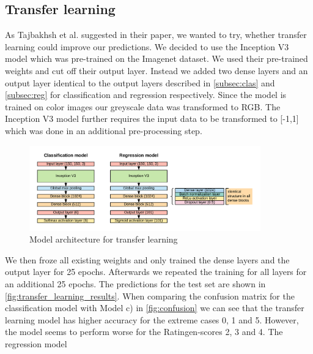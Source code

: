\documentclass[12pt]{article}
\begin{document}
\subsection{Transfer learning}
\label{subsec:tl}

As Tajbakhsh et al. \cite{tajbakhsh_2017} suggested in their paper, we wanted to try, whether transfer learning could improve our predictions. We decided to use the Inception V3 model \cite{szegedy_2015} which was pre-trained on the Imagenet dataset. We used their pre-trained weights and cut off their output layer. Instead we added two dense layers and an output layer identical to the output layers described in \ref{subsec:clas} and \ref{subsec:reg} for classification and regression respectively. Since the model is trained on color images our greyscale data was transformed to RGB. The Inception V3 model further requires the input data to be transformed to [-1,1] which was done in an additional pre-processing step.

\begin{figure}[ht]
\includegraphics[width=10cm]{transfer_learning}	
\caption{Model architecture for transfer learning}
\label{fig:transfer_learning}
\end{figure}

We then froze all existing weights and only trained the dense layers and the output layer for 25 epochs. Afterwards we repeated the training for all layers for an additional 25 epochs. The predictions for the test set are shown in \autoref{fig:transfer_learning_results}. When comparing the confusion matrix for the classification model with Model c) in \autoref{fig:confusion} we can see that the transfer learning model has higher accuracy for the extreme cases 0, 1 and 5. However, the model seems to perform worse for the Ratingen-scores 2, 3 and 4. The regression model
\end{document}
